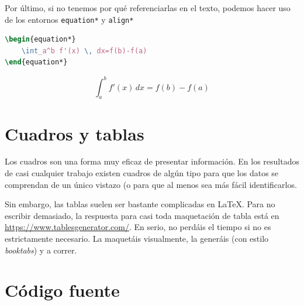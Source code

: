 Por último, si no tenemos por qué referenciarlas en el texto, podemos hacer uso de los entornos \texttt{equation*} y \texttt{align*}

\begin{minipage}[c]{.5\textwidth}
\begin{lstlisting}[language=tex]
\begin{equation*}
	\int_a^b f'(x) \, dx=f(b)-f(a)
\end{equation*}
\end{lstlisting}
\end{minipage}%
\begin{minipage}[c]{.5\textwidth}
\begin{equation*}
	\int_a^b f'(x) \, dx=f(b)-f(a)
\end{equation*}
\end{minipage}

\section{Cuadros y tablas}

Los cuadros son una forma muy eficaz de presentar información. En los resultados de casi cualquier trabajo existen cuadros de algún tipo para que los datos se comprendan de un único vistazo (o para que al menos sea más fácil identificarlos.


Sin embargo, las tablas suelen ser bastante complicadas en \LaTeX. Para no escribir demasiado, la respuesta para casi toda maquetación de tabla está en \href{https://www.tablesgenerator.com/}{https://www.tablesgenerator.com/}. En serio, no perdáis el tiempo si no es estrictamente necesario. La maquetáis visualmente, la generáis (con estilo \textit{booktabs}) y a correr.

\section{Código fuente}

